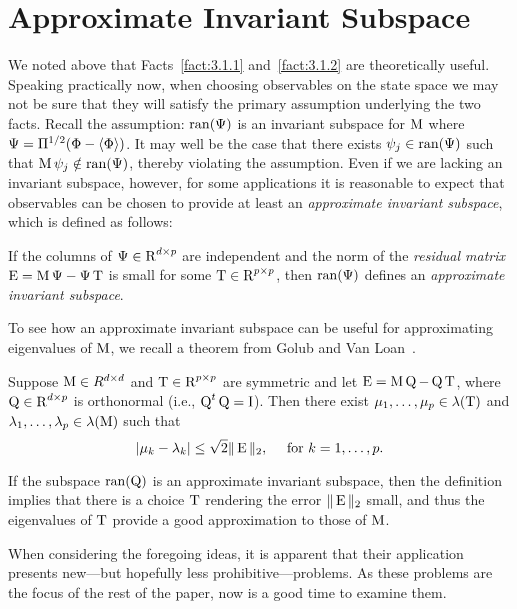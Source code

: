 \section{Approximate Invariant Subspace}
\label{sec:appr-invar-subsp}
We noted above that Facts~\ref{fact:3.1.1} and~\ref{fact:3.1.2} are
theoretically useful. Speaking practically now,
when choosing observables on the state space we may not be sure that
they will satisfy the 
%
%
%
%
primary assumption underlying the two facts. %
Recall the assumption: $\operatorname{ran}(\Psi)$ is an invariant
subspace for $\operatorname{M}$ where $\Psi = \Pi^{1/2}(\Phi - \langle\Phi\rangle)$. It may well be the
case that there exists $\psi_j\in \operatorname{ran}(\Psi)$ such that 
$\operatorname{M}\psi_j \notin \operatorname{ran}(\Psi)$, thereby violating the assumption. 
Even if we are lacking an invariant subspace, however, for some applications it
is reasonable to expect that observables can be chosen to provide at least
an \emph{approximate invariant subspace}, which is defined as follows:
\begin{definition}
If the columns of $\Psi\in \operatorname{R}^{d\times p}$ are independent and the norm of the
\emph{residual matrix} $\operatorname{E} = \operatorname{M}\Psi - \Psi \operatorname{T}$ is small for some  
$\operatorname{T} \in \operatorname{R}^{p\times p}$, then
$\operatorname{ran}(\Psi)$ defines an \emph{approximate invariant subspace}. 
\end{definition}
To see how an approximate invariant subspace can be useful for approximating
eigenvalues of $\operatorname{M}$, we recall a theorem from Golub and Van Loan~\cite{Golub:1996}.
\begin{theorem}
\label{thm:3.2.1}  
Suppose $\operatorname{M} \in R^{d\times d}$ and $\operatorname{T} \in \operatorname{R}^{p\times p}$ are symmetric and let
$\operatorname{E} = \operatorname{M}\operatorname{Q} - \operatorname{Q}\operatorname{T}$, where $\operatorname{Q} \in \operatorname{R}^{d\times p}$ is orthonormal 
(i.e., $\operatorname{Q}^t\operatorname{Q} = \operatorname{I}$). Then there exist $\mu_1,\dots, \mu_p \in \lambda(\operatorname{T})$ and
$\lambda_1, \dots, \lambda_p \in \lambda(\operatorname{M})$ such that
\[
|\mu_k - \lambda_k| \leq \sqrt{2}\|\operatorname{E}\|_2, \quad \text{ for $k = 1, \dots, p$.}
\]
\end{theorem}
If the subspace $\operatorname{ran}(\operatorname{Q})$ is an approximate invariant subspace, then the definition implies that
there is a choice $\operatorname{T}$ rendering the error $\|\operatorname{E}\|_2$ small, and thus the
eigenvalues of $\operatorname{T}$ provide a good approximation to those of $\operatorname{M}$.

When considering the foregoing ideas, it is apparent that their application
presents new---but hopefully less prohibitive---problems. As these problems
are the focus of the rest of the paper, now is a good time to examine
them. 

